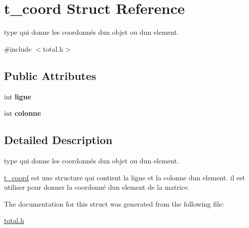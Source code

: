 \hypertarget{structt__coord}{}\section{t\+\_\+coord Struct Reference}
\label{structt__coord}


type qui donne les coordonnés d\textquotesingle{}un objet ou d\textquotesingle{}un element.  




{\ttfamily \#include $<$total.\+h$>$}

\subsection*{Public Attributes}
\begin{DoxyCompactItemize}
\item 
int {\bfseries ligne}\hypertarget{structt__coord_a009f88610a7056e1252cab53887301da}{}\label{structt__coord_a009f88610a7056e1252cab53887301da}

\item 
int {\bfseries colonne}\hypertarget{structt__coord_a4f727b6e97b65d77281b4c119681ed59}{}\label{structt__coord_a4f727b6e97b65d77281b4c119681ed59}

\end{DoxyCompactItemize}


\subsection{Detailed Description}
type qui donne les coordonnés d\textquotesingle{}un objet ou d\textquotesingle{}un element. 

\hyperlink{structt__coord}{t\+\_\+coord} est une structure qui contient la ligne et la colonne d\textquotesingle{}un element. il est utiliser pour donner la coordonné d\textquotesingle{}un element de la matrice. 

The documentation for this struct was generated from the following file\+:\begin{DoxyCompactItemize}
\item 
\hyperlink{total_8h}{total.\+h}\end{DoxyCompactItemize}
